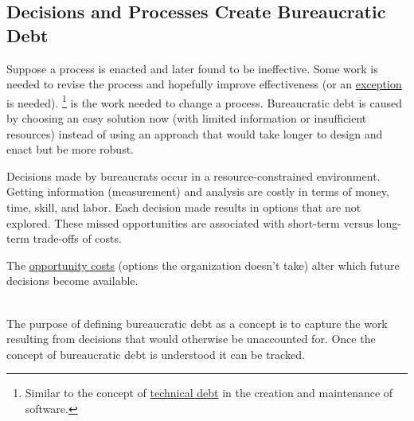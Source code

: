 \subsection*{Decisions and Processes Create Bureaucratic Debt\label{sec:bureaucratic-debt}}


Suppose a \gls{process} is enacted and later found to be ineffective. Some work is needed to revise the process and hopefully improve effectiveness (or an \hyperref[sec:exceptions-to-process]{exception} is needed).
\iftoggle{glossarysubstitutionworks}{\Gls{bureaucratic debt}}{Bureaucratic debt}\footnote{Similar to the concept of \href{https://en.wikipedia.org/wiki/Technical_debt}{technical debt} in the creation and maintenance of software\iftoggle{printedonpaper}{; see Wikipedia entry}{}.
} is 
\iftoggle{glossaryinmargin}{\marginpar{[Glossary]}}{}  the work needed to change a process.
Bureaucratic debt is caused by choosing an easy solution now (with limited information or insufficient resources) instead of using an approach that would take longer to design and enact but be more robust.


Decisions made by \glspl{bureaucrat} occur in a resource-constrained environment.
Getting information (measurement) and analysis are costly in terms of money, time, skill, and labor.
Each decision made results in options that are not explored. These missed opportunities are associated with short-term versus long-term trade-offs of costs.

The \href{https://en.wikipedia.org/wiki/Opportunity_cost}{opportunity costs}
(options the organization doesn't take) alter which future decisions become available.

\ \\

The purpose of defining bureaucratic debt as a concept is to capture the work resulting from decisions that would otherwise be unaccounted for.
Once the concept of bureaucratic debt is understood it can be tracked.

